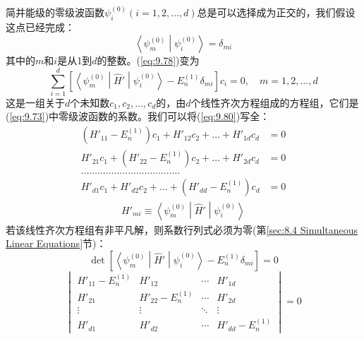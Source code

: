     简并能级的零级波函数$\psi_i^{\left(0\right)}\left(i = 1,2,\ldots,d\right)$总是可以选择成为正交的，我们假设这点已经完成：
    \begin{equation}
        \left\langle \psi_m^{\left(0\right)} \middle| \psi_i^{\left(0\right)} \right\rangle = \delta_{mi}
        \label{eq:9.79}
    \end{equation}
    其中的$m$和$i$是从1到$d$的整数。(\ref{eq:9.78})变为
    \begin{equation}
        \sum_{i=1}^{d}\left[\left\langle \psi_m^{\left(0\right)} \middle| \hat{H}' \middle| \psi_i^{\left(0\right)} \right\rangle - E_n^{\left(1\right)}\delta_{mi}\right]c_i = 0, \quad m = 1,2,\ldots,d
        \label{eq:9.80}
    \end{equation}
    这是一组关于$d$个未知数$c_1, c_2, \ldots, c_d$的，由$d$个线性齐次方程组成的方程组，它们是(\ref{eq:9.73})中零级波函数的系数。我们可以将(\ref{eq:9.80})写全：
    \begin{equation}
        \begin{aligned}
            \left(H'_{11} - E_n^{\left(1\right)}\right)c_1 + H'_{12}c_2 + \ldots + H'_{1d}c_d &= 0 \\
            H'_{21}c_1 + \left(H'_{22} - E_n^{\left(1\right)}\right)c_2 + \ldots + H'_{2d}c_d &= 0 \\
            \ldots\ldots\ldots\ldots\ldots\ldots\ldots\ldots\ldots\ldots\ldots\ldots & \\
            H'_{d1}c_1 + H'_{d2}c_2 + \ldots + \left(H'_{dd} - E_n^{\left(1\right)}\right)c_d &= 0
        \end{aligned}
        \label{eq:9.81}
    \end{equation}
    \begin{eqnarray*}
        H'_{mi} \equiv \left\langle \psi_m^{\left(0\right)} \middle| \hat{H}' \middle| \psi_i^{\left(0\right)} \right\rangle
    \end{eqnarray*}
    若该线性齐次方程组有非平凡解，则系数行列式必须为零(第\ref{sec:8.4 Simultaneous Linear Equations}节)：
    \begin{equation}
        \boxed{
            \det\left[\left\langle \psi_m^{\left(0\right)} \middle| \hat{H}' \middle| \psi_i^{\left(0\right)} \right\rangle - E_n^{\left(1\right)}\delta_{mi}\right] = 0
        }
        \label{eq:9.82}
    \end{equation}
    \begin{equation}
        \begin{vmatrix}
            H'_{11} - E_n^{\left(1\right)} & H'_{12} & \cdots & H'_{1d} \\
            H'_{21} & H'_{22} - E_n^{\left(1\right)} & \cdots & H'_{2d} \\
            \vdots & \vdots & \ddots & \vdots \\
            H'_{d1} & H'_{d2} & \cdots & H'_{dd} - E_n^{\left(1\right)}
        \end{vmatrix} = 0
        \label{eq:9.83}
    \end{equation}


